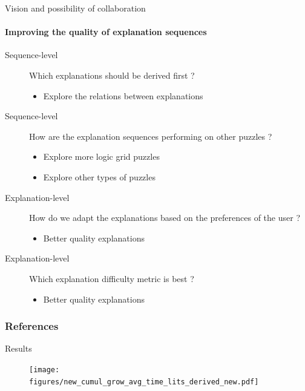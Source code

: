 \documentclass[handout]{beamer}
\begin{document}
	\begin{frame}{ Vision and possibility of collaboration}
		\framesubtitle{Improving the quality of explanation sequences}
	\begin{description}
		\item[Sequence-level]  Which explanations should be derived first ?
		\begin{itemize}
			\item Explore the relations between explanations 
		\end{itemize}
		\item[Sequence-level] How are the explanation sequences performing on other puzzles ? \cite{espasa2021using}
		\begin{itemize}
			\item Explore more logic grid puzzles
			\item Explore other types of puzzles
		\end{itemize}
		\item[Explanation-level] How do we adapt the explanations based on the preferences of the user ? 		
		\begin{itemize}
			\item Better quality explanations 
		\end{itemize}
		\item[Explanation-level] Which explanation difficulty metric is best ? 
		\begin{itemize}
			\item Better quality explanations 
		\end{itemize}
	\end{description}	
	\end{frame}
	
	\begin{frame}[allowframebreaks]
		\frametitle{References}
		
		
	\end{frame}
	
	\begin{frame}{Results}
			\begin{figure}
			\texttt{[image: figures/new\_cumul\_grow\_avg\_time\_lits\_derived\_new.pdf]}
		\end{figure}

	\end{frame}
	
\end{document}
